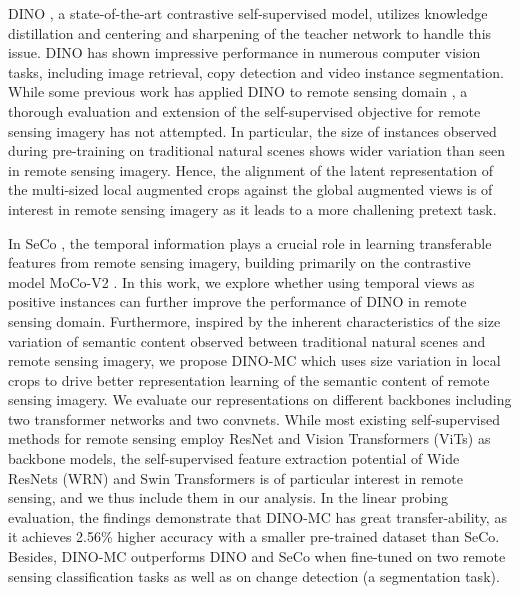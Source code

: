 \documentclass[10pt,twocolumn,letterpaper]{article}
\begin{document}
DINO \cite{caron2021emerging}, a state-of-the-art contrastive self-supervised model, utilizes knowledge distillation and centering
and sharpening of the teacher network \cite{hinton2015distilling} to handle this issue.
DINO has shown impressive performance in numerous computer vision tasks, including image retrieval, copy detection and video instance segmentation. 
While some previous work has applied DINO to remote sensing domain \cite{wang2022last,seneviratne2021self,wang2022selfSAR}, a thorough evaluation and extension of the self-supervised objective for remote sensing imagery has not attempted. 
In particular, the size of instances observed during pre-training on traditional natural scenes shows wider variation than seen in remote sensing imagery. 
Hence, the alignment of the latent representation of the multi-sized local augmented crops against the global augmented views is of interest in remote sensing imagery as it leads to a more challening pretext task.


In SeCo \cite{manas2021seasonal}, the temporal information plays a crucial role in learning transferable features from remote sensing imagery, building primarily on the contrastive model MoCo-V2 \cite{chen2020improved}. 
In this work, we explore whether using temporal views as positive instances can further improve the performance of DINO in remote sensing domain.
Furthermore, inspired by the inherent characteristics of the size variation of semantic content observed between traditional natural scenes and remote sensing imagery, we propose DINO-MC which uses size variation in local crops to drive better representation learning of the semantic content of remote sensing imagery.
We evaluate our representations on different backbones including two transformer networks and two convnets.
While most existing self-supervised methods for remote sensing employ ResNet and Vision Transformers (ViTs) as backbone models, the self-supervised feature extraction potential of Wide ResNets (WRN) and Swin Transformers is of particular interest in remote sensing, and we thus include them in our analysis.
In the linear probing evaluation, the findings demonstrate that DINO-MC has great transfer-ability, as it achieves 2.56\% higher accuracy with a smaller pre-trained dataset than SeCo.
Besides, DINO-MC outperforms DINO and SeCo when fine-tuned on two remote sensing classification tasks as well as on change detection (a segmentation task).
\end{document}
